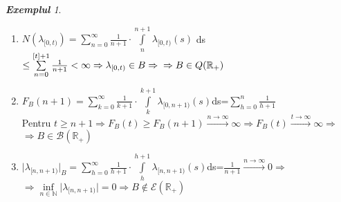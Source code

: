 \documentclass[ a4paper, 12pt]{report}
\theoremstyle{definition}
\theoremstyle{remark}
\newtheorem{exemple}{\bf Exemplul}[section]
\numberwithin{equation}{section}
\begin{document}
\begin{exemple}
\begin{enumerate}
\item $N(\lambda_{[0,t)})=\sum\limits_{n=0}^{\infty}\frac{1}{n+1}\cdot \int\limits_{n}^{n+1}\lambda_{[0,t)}(s)$ ds $\leq \sum\limits_{n=0}^{[t]+1}\frac{1}{n+1}<\infty\Rightarrow\lambda_{[0,t)}\in B \Rightarrow\\\Rightarrow B\in Q(\mathbb{R}_+)$
\item
$F_B(n+1)=\sum\limits_{k=0}^{\infty}\frac{1}{k+1}\cdot\int\limits_{k}^{k+1}\lambda_{[0,n+1)}(s)$ds=$\sum\limits_{h=0}^{n}\frac{1}{h+1}$\\
Pentru $t\geq n+1\Rightarrow F_B(t)\geq F_B(n+1)\xrightarrow{n\rightarrow\infty}\infty \Rightarrow F_B(t)\xrightarrow{t\xrightarrow{}\infty}\infty\Rightarrow$\\$\Rightarrow B\in\mathcal{B}(\mathbb{R}_+)$
\newpage
\item
$\lvert\lambda_{[n,n+1)}\rvert_B=\sum\limits_{h=0}^{\infty}\frac{1}{h+1}\cdot\int\limits_{h}^{h+1}\lambda_{[n,n+1)}(s)$ds=$\frac{1}{n+1}\xrightarrow{n\xrightarrow{}\infty}0\Rightarrow$\\$ \Rightarrow\inf\limits_{n \in \mathbb{N}} \lvert \lambda_{[n,n+1)} \rvert = 0 \Rightarrow B\notin\mathcal{E}(\mathbb{R}_+)$
\end{enumerate}
\end{exemple}
\end{document}
